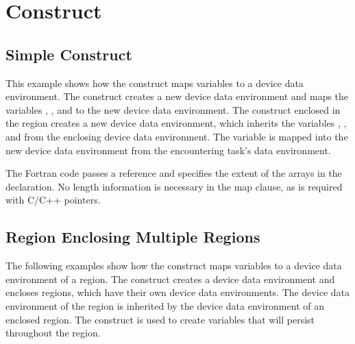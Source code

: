 \pagebreak
\section{  Construct}
\label{sec:target_data}

\subsection{Simple   Construct}
\label{subsec:target_data_simple}

This example shows how the   construct maps variables 
to a device data environment. The   construct creates 
a new device data environment and maps the variables , , and  to the new device 
data environment. The  construct enclosed in the  
 region creates a new device data environment, which inherits the 
variables , , and  from the enclosing device data environment. The variable 
 is mapped into the new device data environment from the encountering task's data 
environment.


\pagebreak
The Fortran code passes a reference and specifies the extent of the arrays in the 
declaration. No length information is necessary in the map clause, as is required 
with C/C++ pointers.


\subsection{  Region Enclosing Multiple  Regions}
\label{subsec:target_data_multiregion}

The following examples show how the   construct maps 
variables to a device data environment of a  region. The  
 construct creates a device data environment and encloses  
regions, which have their own device data environments. The device data environment 
of the   region is inherited by the device data environment 
of an enclosed  region. The   construct 
is used to create variables that will persist throughout the   
region.

